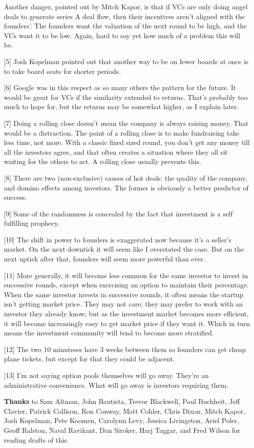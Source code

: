 Another danger, pointed out by Mitch Kapor, is that if VCs are only
doing angel deals to generate series A deal flow, then their incentives
aren't aligned with the founders'. The founders want the valuation of
the next round to be high, and the VCs want it to be low. Again, hard to
say yet how much of a problem this will be.

{[}5{]} Josh Kopelman pointed out that another way to be on fewer boards
at once is to take board seats for shorter periods.

{[}6{]} Google was in this respect as so many others the pattern for the
future. It would be great for VCs if the similarity extended to returns.
That's probably too much to hope for, but the returns may be somewhat
higher, as I explain later.

{[}7{]} Doing a rolling close doesn't mean the company is always raising
money. That would be a distraction. The point of a rolling close is to
make fundraising take less time, not more. With a classic fixed sized
round, you don't get any money till all the investors agree, and that
often creates a situation where they all sit waiting for the others to
act. A rolling close usually prevents this.

{[}8{]} There are two (non-exclusive) causes of hot deals: the quality
of the company, and domino effects among investors. The former is
obviously a better predictor of success.

{[}9{]} Some of the randomness is concealed by the fact that investment
is a self fulfilling prophecy.

{[}10{]} The shift in power to founders is exaggerated now because it's
a seller's market. On the next downtick it will seem like I overstated
the case. But on the next uptick after that, founders will seem more
powerful than ever.

{[}11{]} More generally, it will become less common for the same
investor to invest in successive rounds, except when exercising an
option to maintain their percentage. When the same investor invests in
successive rounds, it often means the startup isn't getting market
price. They may not care; they may prefer to work with an investor they
already know; but as the investment market becomes more efficient, it
will become increasingly easy to get market price if they want it. Which
in turn means the investment community will tend to become more
stratified.

{[}12{]} The two 10 minuteses have 3 weeks between them so founders can
get cheap plane tickets, but except for that they could be adjacent.

{[}13{]} I'm not saying option pools themselves will go away. They're an
administrative convenience. What will go away is investors requiring
them.

\textbf{Thanks} to Sam Altman, John Bautista, Trevor Blackwell, Paul
Buchheit, Jeff Clavier, Patrick Collison, Ron Conway, Matt Cohler, Chris
Dixon, Mitch Kapor, Josh Kopelman, Pete Koomen, Carolynn Levy, Jessica
Livingston, Ariel Poler, Geoff Ralston, Naval Ravikant, Dan Siroker,
Harj Taggar, and Fred Wilson for reading drafts of this.

